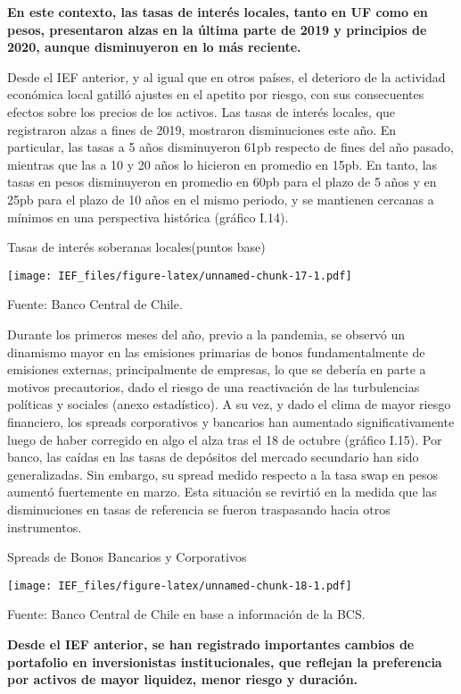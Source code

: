 \documentclass[
]{book}
\begin{document}
\textbf{En este contexto, las tasas de interés locales, tanto en UF como en pesos, presentaron alzas en la última parte de 2019 y principios de 2020, aunque disminuyeron en lo más reciente.}

Desde el IEF anterior, y al igual que en otros países, el deterioro de la actividad
económica local gatilló ajustes en el apetito por riesgo, con sus consecuentes
efectos sobre los precios de los activos. Las tasas de interés locales, que
registraron alzas a fines de 2019, mostraron disminuciones este año. En
particular, las tasas a 5 años disminuyeron 61pb respecto de fines del año
pasado, mientras que las a 10 y 20 años lo hicieron en promedio en 15pb. En
tanto, las tasas en pesos disminuyeron en promedio en 60pb para el plazo de 5
años y en 25pb para el plazo de 10 años en el mismo periodo, y se mantienen
cercanas a mínimos en una perspectiva histórica (gráfico I.14).

Tasas de interés soberanas locales(puntos base)

\texttt{[image: IEF\_files/figure-latex/unnamed-chunk-17-1.pdf]}

Fuente: Banco Central de Chile.

Durante los primeros meses del año, previo a la pandemia, se observó un
dinamismo mayor en las emisiones primarias de bonos fundamentalmente de
emisiones externas, principalmente de empresas, lo que se debería en parte a
motivos precautorios, dado el riesgo de una reactivación de las turbulencias
políticas y sociales (anexo estadístico). A su vez, y dado el clima de mayor
riesgo financiero, los spreads corporativos y bancarios han aumentado
significativamente luego de haber corregido en algo el alza tras el 18 de octubre
(gráfico I.15). Por banco, las caídas en las tasas de depósitos del mercado secundario han sido generalizadas. Sin embargo, su spread medido respecto
a la tasa swap en pesos aumentó fuertemente en marzo. Esta situación se
revirtió en la medida que las disminuciones en tasas de referencia se fueron
traspasando hacia otros instrumentos.

Spreads de Bonos Bancarios y Corporativos

\texttt{[image: IEF\_files/figure-latex/unnamed-chunk-18-1.pdf]}

Fuente: Banco Central de Chile en base a información de la BCS.

\textbf{Desde el IEF anterior, se han registrado importantes cambios de portafolio en inversionistas institucionales, que reflejan la preferencia por activos de mayor liquidez, menor riesgo y duración.}
\end{document}
